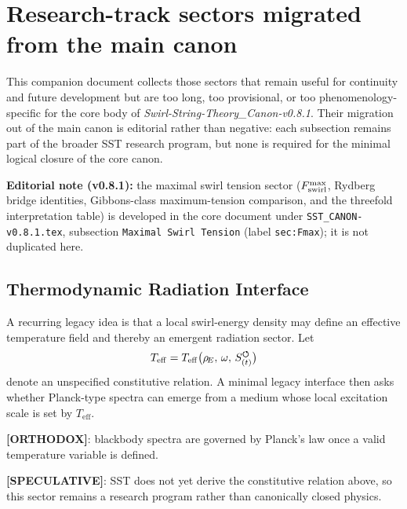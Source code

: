 
\section{Research-track sectors migrated from the main canon}

\noindent
This companion document collects those sectors that remain useful for continuity and future development but are too long, too provisional, or too phenomenology-specific for the core body of \textit{Swirl-String-Theory\_Canon-v0.8.1}. Their migration out of the main canon is editorial rather than negative: each subsection remains part of the broader SST research program, but none is required for the minimal logical closure of the core canon.

\medskip
\noindent
\textbf{Editorial note (v0.8.1):} the maximal swirl tension sector ($F_{\rm swirl}^{\max}$, Rydberg bridge identities, Gibbons-class maximum-tension comparison, and the threefold interpretation table) is developed in the core document under \verb|SST_CANON-v0.8.1.tex|, subsection \texttt{Maximal Swirl Tension} (label \texttt{sec:Fmax}); it is not duplicated here.

\medskip








\subsection{Thermodynamic Radiation Interface}
A recurring legacy idea is that a local swirl-energy density may define an effective temperature field and thereby an emergent radiation sector. Let
\begin{align}
    T_{\mathrm{eff}} = T_{\mathrm{eff}}\big(\rho_{\!E},\, \omega,\, {S_{(t)}^{\boldsymbol{\circlearrowleft}}}\big)
\end{align}
denote an unspecified constitutive relation. A minimal legacy interface then asks whether Planck-type spectra can emerge from a medium whose local excitation scale is set by $T_{\mathrm{eff}}$.

\textbf{[ORTHODOX]}: blackbody spectra are governed by Planck's law once a valid temperature variable is defined.

\textbf{[SPECULATIVE]}: SST does not yet derive the constitutive relation above, so this sector remains a research program rather than canonically closed physics.

